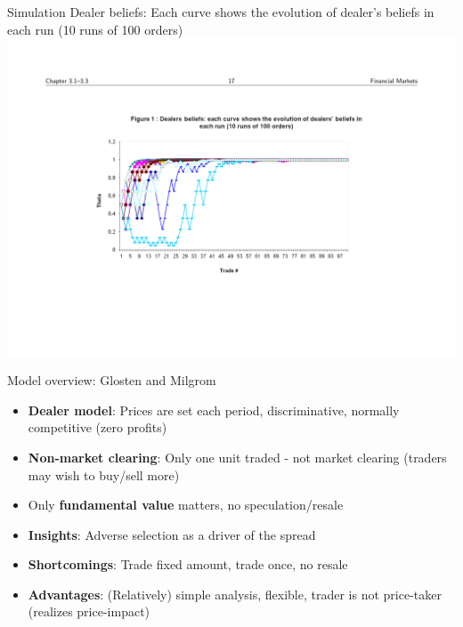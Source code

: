 \documentclass[english,10pt]{beamer}
\begin{document}
\begin{frame}{Simulation}
	Dealer beliefs: Each curve shows the evolution of dealer's beliefs in each run (10 runs of 100 orders)
	\quad
	\center
	\includegraphics[width=1\linewidth]{pics/DealerBeliefs_Image.pdf}
\end{frame}


\begin{frame}{Model overview: Glosten and Milgrom}
	\begin{itemize}
		\item \textbf{Dealer model}: Prices are set each period, discriminative, normally competitive (zero profits)
		\item \textbf{Non-market clearing}: Only one unit traded  - not market clearing (traders may wish to buy/sell more)
		\item Only \textbf{fundamental value} matters,  no speculation/resale
	\end{itemize}
	\begin{itemize}
		\item \textbf{Insights}: Adverse selection as a driver of the spread
		\item \textbf{Shortcomings}: Trade fixed amount, trade once, no resale
		\item \textbf{Advantages}: (Relatively) simple analysis, flexible, trader is not price-taker (realizes price-impact)
	\end{itemize}
\end{frame}
\end{document}
